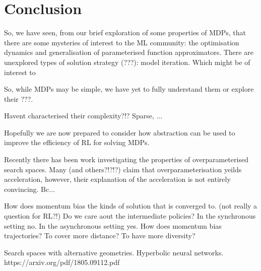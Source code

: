 \section{Conclusion}

So, we have seen, from our brief exploration of some properties of MDPs, that
there are some mysteries of interest to the ML community: the optimisation dynamics and generalisation of
parameterised function approximators.
There are unexplored types of solution strategy (???): model iteration. Which might be of interest to

So, while MDPs may be simple, we have yet to fully understand them or explore their ???.

Havent characterised their complexity?!? Sparse, ...

Hopefully we are now prepared to consider how abstraction can be used to improve the efficiency of RL for solving MDPs.



Recently there has been work investigating the properties of overparameterised search spaces.
Many \cite{Arora2018} (and others?!?!?) claim that overparameterisation yeilds acceleration, however,
their explanation of the acceleration is not entirely convincing. Bc...

How does momentum bias the kinds of solution that is converged to. (not really a question for RL?!)
Do we care aout the intermediate policies? In the synchronous setting no. In the asynchronous setting yes.
How does momentum bias trajectories? To cover more distance? To have more diversity?

Search spaces with alternative geometries.
Hyperbolic neural networks. https://arxiv.org/pdf/1805.09112.pdf
